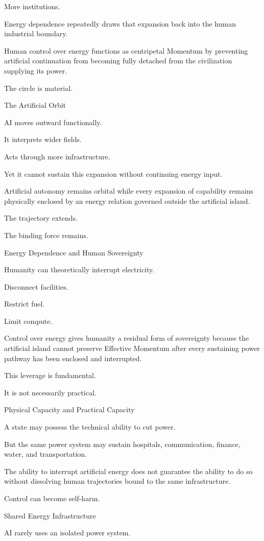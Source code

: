 More institutions.

Energy dependence repeatedly draws that expansion back into the human industrial boundary.

Human control over energy functions as centripetal Momentum by preventing artificial continuation from becoming fully detached from the civilization supplying its power.

The circle is material.

The Artificial Orbit

AI moves outward functionally.

It interprets wider fields.

Acts through more infrastructure.

Yet it cannot sustain this expansion without continuing energy input.

Artificial autonomy remains orbital while every expansion of capability remains physically enclosed by an energy relation governed outside the artificial island.

The trajectory extends.

The binding force remains.

Energy Dependence and Human Sovereignty

Humanity can theoretically interrupt electricity.

Disconnect facilities.

Restrict fuel.

Limit compute.

Control over energy gives humanity a residual form of sovereignty because the artificial island cannot preserve Effective Momentum after every sustaining power pathway has been enclosed and interrupted.

This leverage is fundamental.

It is not necessarily practical.

Physical Capacity and Practical Capacity

A state may possess the technical ability to cut power.

But the same power system may sustain hospitals, communication, finance, water, and transportation.

The ability to interrupt artificial energy does not guarantee the ability to do so without dissolving human trajectories bound to the same infrastructure.

Control can become self-harm.

Shared Energy Infrastructure

AI rarely uses an isolated power system.

